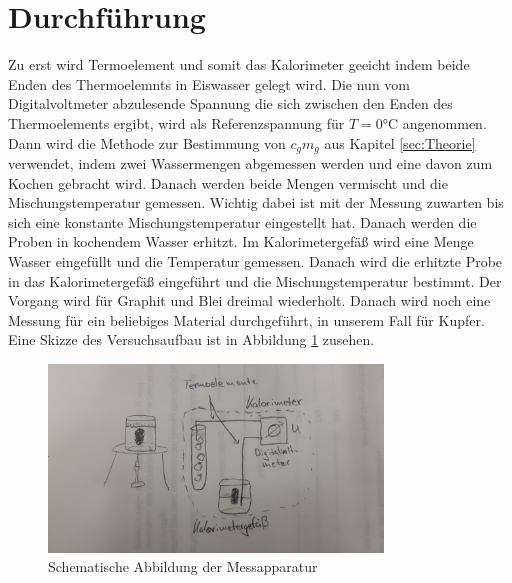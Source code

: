 \section{Durchführung}
\label{sec:Durchführung}
Zu erst wird Termoelement und somit das Kalorimeter geeicht indem
beide Enden des Thermoelemnts in Eiswasser gelegt wird. Die nun vom Digitalvoltmeter
abzulesende Spannung die sich zwischen den Enden des Thermoelements ergibt, wird
als Referenzspannung für $T = 0 \si{\celsius}$ angenommen.
Dann wird die Methode zur Bestimmung von $c_gm_g$ aus Kapitel \ref{sec:Theorie}
verwendet, indem zwei Wassermengen abgemessen werden und eine davon zum Kochen
gebracht wird. Danach werden beide Mengen vermischt und die Mischungstemperatur
gemessen. Wichtig dabei ist mit der Messung zuwarten bis sich eine konstante
Mischungstemperatur eingestellt hat. Danach werden die Proben in kochendem
Wasser erhitzt. Im Kalorimetergefäß wird eine Menge Wasser eingefüllt und die
Temperatur gemessen. Danach wird die erhitzte Probe in das Kalorimetergefäß
eingeführt und die Mischungstemperatur bestimmt.
Der Vorgang wird für Graphit und Blei dreimal wiederholt.  Danach wird noch eine
Messung für ein beliebiges Material durchgeführt, in unserem Fall für Kupfer.
Eine Skizze des Versuchsaufbau ist in Abbildung \ref{fig:skizze} zusehen.

\begin{figure}
  \centering
  \includegraphics[height=5cm]{logos/skizze.jpg}
  \caption{Schematische Abbildung der Messapparatur}
  \label{fig:skizze}
\end{figure}
